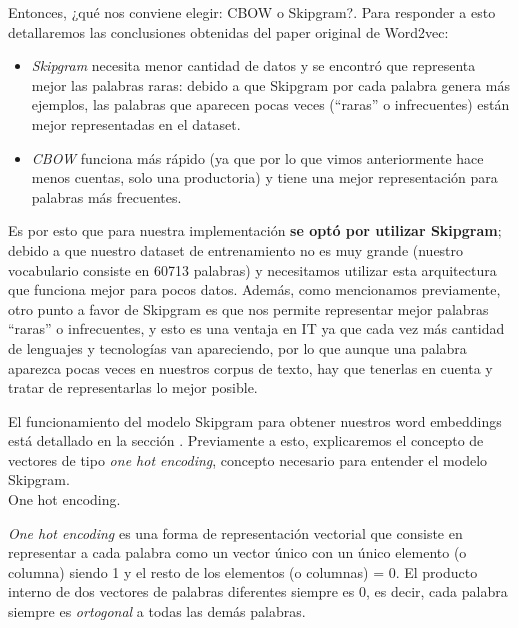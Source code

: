 \documentclass[12pt,a4paper]{article}
\makeatletter
\renewcommand\paragraph{\@startsection{paragraph}{4}{\z@}
            {-2.5ex\@plus -1ex \@minus -.25ex}
            {1.25ex \@plus .25ex}
            {\normalfont\normalsize\bfseries}}
\makeatother
\begin{document}
\begin{sloppypar}
\begin{itemize}
\end{itemize}

Entonces, ¿qué nos conviene elegir: CBOW o Skipgram?. Para responder a esto detallaremos las conclusiones obtenidas del paper original de Word2vec\cite{NLP_11}:
\begin{itemize}
\item \textit{Skipgram} necesita menor cantidad de datos y se encontró que representa mejor las palabras raras: debido a que Skipgram por cada palabra genera más ejemplos, las palabras que aparecen pocas veces (“raras” o infrecuentes) están mejor representadas en el dataset. 
\item \textit{CBOW} funciona más rápido (ya que por lo que vimos anteriormente hace menos cuentas, solo una productoria) y tiene una mejor representación para palabras más frecuentes.
\end{itemize}

Es por esto que para nuestra implementación \textbf{se optó por utilizar Skipgram}; debido a que nuestro dataset de entrenamiento no es muy grande (nuestro vocabulario consiste en 60713 palabras) y necesitamos utilizar esta arquitectura que funciona mejor para pocos datos. Además, como mencionamos previamente, otro punto a favor de Skipgram es que {nos permite representar mejor palabras “raras” o infrecuentes}, y esto es una ventaja en IT ya que cada vez más cantidad de lenguajes y tecnologías van apareciendo, por lo que aunque una palabra aparezca pocas veces en nuestros corpus de texto, hay que tenerlas en cuenta y tratar de representarlas lo mejor posible.

El funcionamiento del modelo Skipgram para obtener nuestros word embeddings está detallado en la sección \textit{}. Previamente a esto, explicaremos el concepto de vectores de tipo \textit{one hot encoding}, concepto necesario para entender el modelo Skipgram.
\\

\paragraph{One hot encoding.}\label{one_hot_enc}

\textit{One hot encoding} es una forma de representación vectorial que consiste en representar a cada palabra como un vector único con un único elemento (o columna) siendo 1 y el resto de los elementos (o columnas) = 0. El producto interno de dos vectores de palabras diferentes siempre es 0, es decir, cada palabra siempre es \textit{ortogonal} a todas las demás palabras\cite{NLP_9}.


\end{sloppypar}
\end{document}
